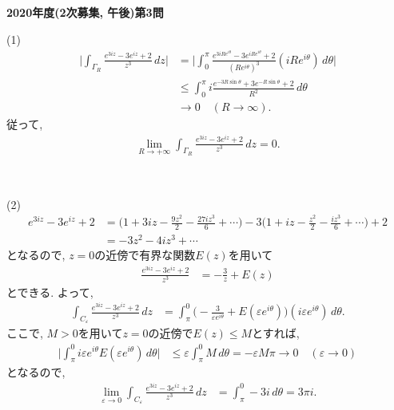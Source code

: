 ﻿\documentclass[../main]{subfiles}
\begin{document}
\begin{center}
\bf{\LARGE 2020年度(2次募集, 午後)第3問}
\end{center}
\noindent
(1)
  \begin{align*}
    \biggl|\int_{\Gamma_R}\frac{e^{3iz}-3e^{iz}+2}{z^3}\,dz\biggr|
    &=\biggl|\int_0^\pi 
    \frac{e^{3iRe^{i\theta}}-3e^{iRe^{i\theta}}+2}
    {(Re^{i\theta})^3}(iRe^{i\theta})\,d\theta\biggr| \\
    &\leq\int_0^\pi
    i\frac{e^{-3R\sin\theta}+3e^{-R\sin\theta}+2}{R^2}
    \,d\theta \\
    &\longrightarrow 0 \quad (R\to \infty).
  \end{align*}
  従って, 
  \begin{align*}
    \lim_{R\to+\infty}\int_{\Gamma_R}
    \frac{e^{3iz}-3e^{iz}+2}{z^3}\,dz=0.
  \end{align*}
\par\ 
\par\noindent
(2)
  \begin{align*}
    e^{3iz}-3e^{iz}+2
    &=\biggl(1+3iz-\frac{9z^2}{2}-\frac{27iz^3}{6}+\cdots\biggr)
    -3\biggl(1+iz-\frac{z^2}{2}-\frac{iz^3}{6}+\cdots\biggr)+2 \\
    &=-3z^2-4iz^3+\cdots
  \end{align*}
  となるので, $z=0$の近傍で有界な関数$E(z)$を用いて
  \begin{align*}
    \frac{e^{3iz}-3e^{iz}+2}{z^3}
    &=-\frac{3}{z}+E(z)
  \end{align*}
  とできる.
  よって, 
  \begin{align*}
    \int_{C_\varepsilon}\frac{e^{3iz}-3e^{iz}+2}{z^3}\,dz
    &=\int_\pi^0 
    \biggl(-\frac{3}{\varepsilon e^{i\theta}}+E(\varepsilon e^{i\theta})\biggr)
    (i\varepsilon e^{i\theta})\,d\theta.
  \end{align*}
  ここで, $M>0$を用いて$z=0$の近傍で$E(z)\leq M$とすれば,
  \begin{align*}
    \biggl|\int_\pi^0 i\varepsilon e^{i\theta}E(\varepsilon e^{i\theta})\,d\theta\biggr|
    &\leq \varepsilon\int_\pi^0 M\,d\theta
    =-\varepsilon M\pi
    \longrightarrow 0 \quad (\varepsilon\to 0)
  \end{align*}
  となるので, 
  \begin{align*}
    \lim_{\varepsilon\to 0}\int_{C_\varepsilon}\frac{e^{3iz}-3e^{iz}+2}{z^3}\,dz
    &=\int_\pi^0 -3i\,d\theta
    =3\pi i.
  \end{align*}
\par\ 
\par\noindent
\end{document}
